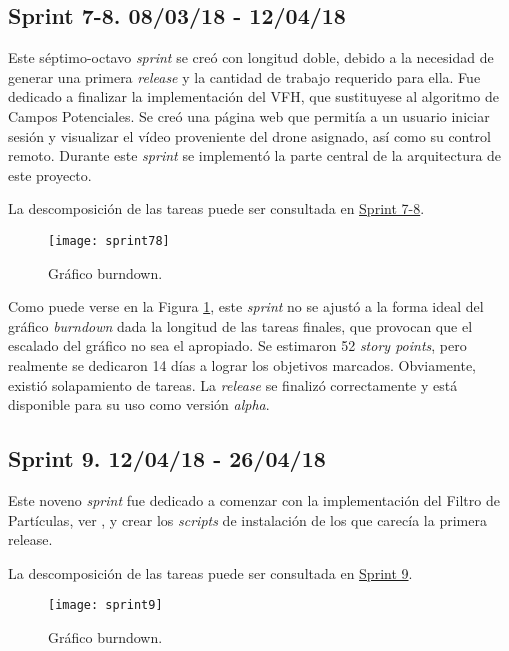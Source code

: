 \subsection{Sprint 7-8. 08/03/18 - 12/04/18}

Este séptimo-octavo \emph{sprint} se creó con longitud doble, debido a la necesidad de generar una primera \emph{release} y la cantidad de trabajo requerido para ella. Fue dedicado a finalizar la implementación del VFH, que sustituyese al algoritmo de Campos Potenciales. Se creó una página web que permitía a un usuario iniciar sesión y visualizar el vídeo proveniente del drone asignado, así como su control remoto.
Durante este \emph{sprint} se implementó la parte central de la arquitectura de este proyecto.

La descomposición de las tareas puede ser consultada en \href{https://github.com/mbm0089/gii_0_17.02_snsi/milestone/7?closed=1}{Sprint 7-8}.

\begin{figure}
	\centering
	\texttt{[image: sprint78]}
	\caption[Burndown Sprint 7-8]{Gráfico burndown.}\label{fig:sprint78}
\end{figure}

Como puede verse en la Figura \ref{fig:sprint78}, este \emph{sprint} no se ajustó a la forma ideal del gráfico \emph{burndown} dada la longitud de las tareas finales, que provocan que el escalado del gráfico no sea el apropiado.
Se estimaron 52 \emph{story points}, pero realmente se dedicaron 14 días a lograr los objetivos marcados. Obviamente, existió solapamiento de tareas. La \emph{release} se finalizó correctamente y está disponible para su uso como versión \emph{alpha}.

\subsection{Sprint 9. 12/04/18 - 26/04/18}

Este noveno \emph{sprint} fue dedicado a comenzar con la implementación del Filtro de Partículas, ver \citep{art:PFTuto},  y crear los \emph{scripts} de instalación de los que carecía la primera release.

La descomposición de las tareas puede ser consultada en \href{https://github.com/mbm0089/gii_0_17.02_snsi/milestone/8?closed=1}{Sprint 9}.

\begin{figure}
	\centering
	\texttt{[image: sprint9]}
	\caption[Burndown Sprint 9]{Gráfico burndown.}\label{fig:sprint9}
\end{figure}

